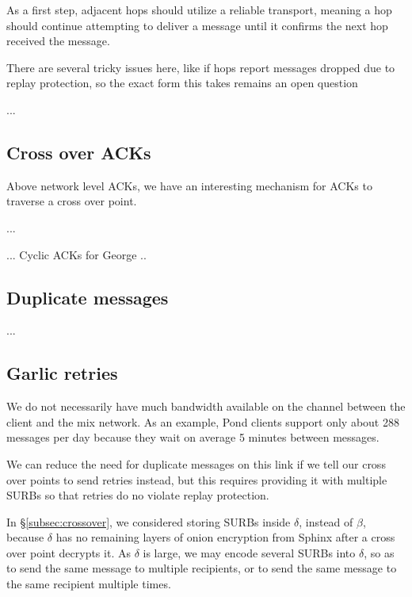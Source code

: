 As a first step, adjacent hops should utilize a reliable transport,
meaning a hop should continue attempting to deliver a message until
it confirms the next hop received the message.  

There are several tricky issues here, like if hops report messages
dropped due to replay protection, so the exact form this takes
remains an open question \cite{??cite??all??the??things??}

...


\subsection{Cross over ACKs}

Above network level ACKs, we have an interesting mechanism for ACKs
to traverse a cross over point.  

...



... Cyclic ACKs for George ..


\subsection{Duplicate messages}

...


\subsection{Garlic retries}\label{subsec:garlic_retries}

We do not necessarily have much bandwidth available on the channel
between the client and the mix network.  As an example, Pond clients
support only about 288 messages per day because they wait on average
5 minutes between messages.

We can reduce the need for duplicate messages on this link if
we tell our cross over points to send retries instead, but this
requires providing it with multiple SURBs so that retries do no
violate replay protection.

In \S\ref{subsec:crossover}, we considered storing SURBs inside
$\delta$, instead of $\beta$, because $\delta$ has no remaining layers
of onion encryption from Sphinx after a cross over point decrypts it. 
As $\delta$ is large, we may encode several SURBs into $\delta$,
so as to send the same message to multiple recipients, or to send
the same message to the same recipient multiple times.  

